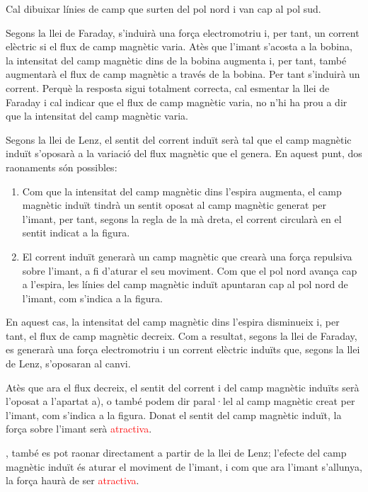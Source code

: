 \begin{solapartat}
 Cal dibuixar línies de camp que surten del pol nord i van cap al pol sud.

 Segons la llei de Faraday, s'induirà una força electromotriu i, per tant, un corrent elèctric si el flux de camp magnètic varia.
Atès que l'imant s'acosta a la bobina, la intensitat del camp magnètic dins de la bobina augmenta i, per tant, també augmentarà el flux de camp magnètic a través de la bobina. Per tant s'induirà un corrent. Perquè la resposta sigui totalment correcta, cal esmentar la llei de Faraday i cal indicar que el flux de camp magnètic varia, no n'hi ha prou a dir que la intensitat del camp magnètic varia.

 Segons la llei de Lenz, el sentit del corrent induït serà tal que el camp magnètic induït s'oposarà a la variació del flux magnètic que el genera. En aquest punt, dos raonaments són possibles:
\begin{enumerate}[label=\arabic*)]
  \item Com que la intensitat del camp magnètic dins l'espira augmenta, el camp magnètic induït tindrà un sentit oposat al camp magnètic generat per l'imant, per tant, segons la regla de la mà dreta, el corrent circularà en el sentit indicat a la figura.
  \item El corrent induït generarà un camp magnètic que crearà una força repulsiva sobre l'imant, a fi d'aturar el seu moviment. Com que el pol nord avança cap a l'espira, les línies del camp magnètic induït apuntaran cap al pol nord de l'imant, com s'indica a la figura.
\end{enumerate}
\end{solapartat}

\begin{solapartat}
 En aquest cas, la intensitat del camp magnètic dins l'espira disminueix i, per tant, el flux de camp magnètic decreix. Com a resultat, segons la llei de Faraday, es generarà una força electromotriu i un corrent elèctric induïts que, segons la llei de Lenz, s'oposaran al canvi.

 Atès que ara el flux decreix, el sentit del corrent i del camp magnètic induïts serà l'oposat a l'apartat a), o també podem dir paral·lel al camp magnètic creat per l'imant, com s'indica a la figura.
Donat el sentit del camp magnètic induït, la força sobre l'imant serà \textcolor{red}{atractiva}.

, també es pot raonar directament a partir de la llei de Lenz; l'efecte del camp magnètic induït és aturar el moviment de l'imant, i com que ara l'imant s'allunya, la força haurà de ser \textcolor{red}{atractiva}.
\end{solapartat}
